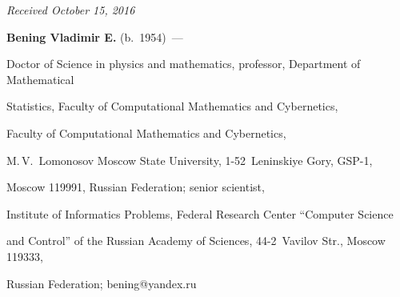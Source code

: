 \vspace*{-3pt}





\hfill{\small\textit{Received October 15, 2016}}





\Contrl





\noindent


\textbf{Bening Vladimir E.} (b.\ 1954)~---


Doctor of Science in physics and mathematics, professor, Department of Mathematical 


Statistics, Faculty of Computational Mathematics and Cybernetics, 


Faculty of Computational Mathematics and Cybernetics, 


M.\,V.~Lomonosov Moscow State University, 1-52~Leninskiye Gory, GSP-1, 


Moscow 119991, Russian Federation; senior scientist,


Institute of Informatics Problems, Federal Research Center ``Computer Science 


and Control'' of the Russian Academy of Sciences, 44-2~Vavilov Str., Moscow 119333,  


Russian Federation; \mbox{bening@yandex.ru}


\label{end\stat}








\renewcommand{\bibname}{\protect\rm Литература} 


